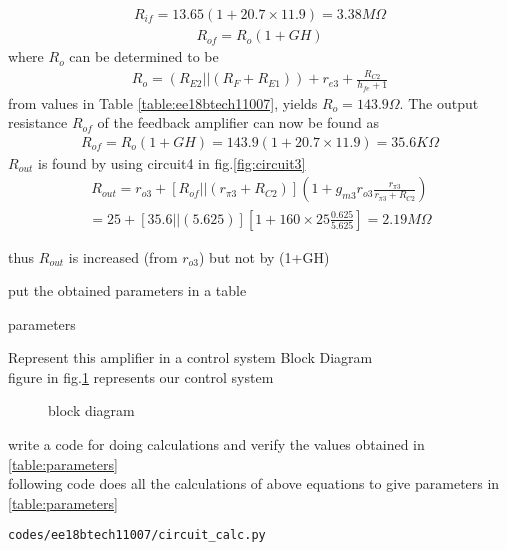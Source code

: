 \begin{enumerate}[label=\thesubsection.\arabic*.,ref=\thesubsection.\theenumi]
{\begin{align}
    R_{if}=13.65(1+20.7\times11.9)=3.38M\Omega
\end{align}
\begin{align}
    R_{of}=R_o(1+GH)
\end{align}
where $R_o$ can be determined to be 
 \begin{align}
    R_o=(R_{E2}||(R_F+R_{E1}))+r_{e3}+\frac{R_{C2}}{h_{fe}+1}
\end{align}
from values in Table \ref{table:ee18btech11007}, yields $R_o = 143.9 \Omega$. The output resistance $R_{of}$ of the feedback amplifier can now be found as
\begin{align}
    R_{of}=R_o(1+GH)=143.9(1+20.7\times11.9)=35.6K\Omega
\end{align}
$R_{out}$ is found by using circuit4 in fig.\ref{fig:circuit3}
\begin{align}
    R_{out}=r_{o3}+[R_{of}||(r_{\pi3}+R_{C2})](1+g_{m3}r_{o3}\frac{r_{\pi3}}{r_{\pi3}+R_{C2}})
\end{align}
\begin{align}
=25+[35.6||(5.625)][1+160\times25\frac{0.625}{5.625}]=2.19M\Omega \end{align}

thus $R_{out}$ is increased (from $r_{o3}$) but not by (1+GH)
\item put the obtained parameters in a table
\\
\solution 
\begin{table}[!ht]
\centering

\caption{parameters}
\label{table:parameters}
\end{table}
\item Represent this amplifier in  a control system Block Diagram
\\
\solution figure in  fig.\ref{fig:block_diagram} represents our control system
\begin{figure}[!ht]
	\begin{center}
		
		\resizebox{\columnwidth}{!}{}
	\end{center}
\caption{block diagram}
\label{fig:block_diagram}
\end{figure}
\item write a code for doing calculations and verify the values obtained in \ref{table:parameters} 
\\
\solution 
following code does all the calculations of above equations to give parameters in
\ref{table:parameters} 
\begin{lstlisting}
codes/ee18btech11007/circuit_calc.py
\end{lstlisting}
}%



\end{enumerate}
